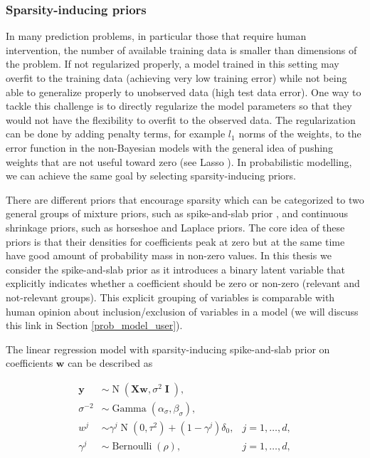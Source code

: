 \documentclass[dissertation,math,vertlayout,pdfa,colorlinks]{aaltoseries}
\newcommand{\bw}{\bm{w}}
\newcommand{\bX}{\bm{X}}
\newcommand{\by}{\bm{y}}
\DeclareMathOperator{\eye}{\textbf{I}}
\DeclareMathOperator{\bernoullipdf}{Bernoulli}
\DeclareMathOperator{\normalpdf}{N}
\DeclareMathOperator{\gammapdf}{Gamma}
\begin{document}
\subsubsection{Sparsity-inducing priors}

In many prediction problems, in particular those that require human intervention, the number of available training data is smaller than dimensions of the problem. If not regularized properly, a model trained in this setting may overfit to the training data (achieving very low training error) while not being able to generalize properly to unobserved data (high test data error). One way to tackle this challenge is to directly regularize the model parameters so that they would not have the flexibility to overfit to the observed data. The regularization can be done by adding penalty terms, for example $l_1$ norms of the weights, to the error function in the non-Bayesian models with the general idea of pushing weights that are not useful toward zero (see Lasso \cite{lasso2011}). In probabilistic modelling, we can achieve the same goal by selecting sparsity-inducing priors. 

There are different priors that encourage sparsity which can be categorized to two general groups of mixture priors, such as spike-and-slab prior \cite{spike_slab1993}, and continuous shrinkage priors, such as horseshoe \cite{horseshoe_2017} and Laplace \cite{seeger2008bayesian} priors. The core idea of these priors is that their densities for coefficients peak at zero but at the same time have good amount of probability mass in non-zero values. In this thesis we consider the spike-and-slab prior as it introduces a binary latent variable that explicitly indicates whether a coefficient should be zero or non-zero (relevant and not-relevant groups). This explicit grouping of variables is comparable with human opinion about inclusion/exclusion of variables in a model (we will discuss this link in Section \ref{prob_model_user}).

The linear regression model with sparsity-inducing spike-and-slab prior on coefficients $\bw$ can be described as

\begin{align}\label{Eq:ss_Bayesian_regression}
\by &\sim \normalpdf(\bX\bw,\sigma^2 \eye), \\
\sigma^{-2} &\sim \gammapdf(\alpha_{\sigma}, \beta_{\sigma}), \nonumber \\
w^j &\sim \gamma^j \normalpdf(0, \tau^2) + (1 - \gamma^j) \delta_0,  & j=1,\ldots,d, \nonumber\\
\gamma^j &\sim \bernoullipdf(\rho), & j=1,\ldots,d, \nonumber
\end{align}
\end{document}
